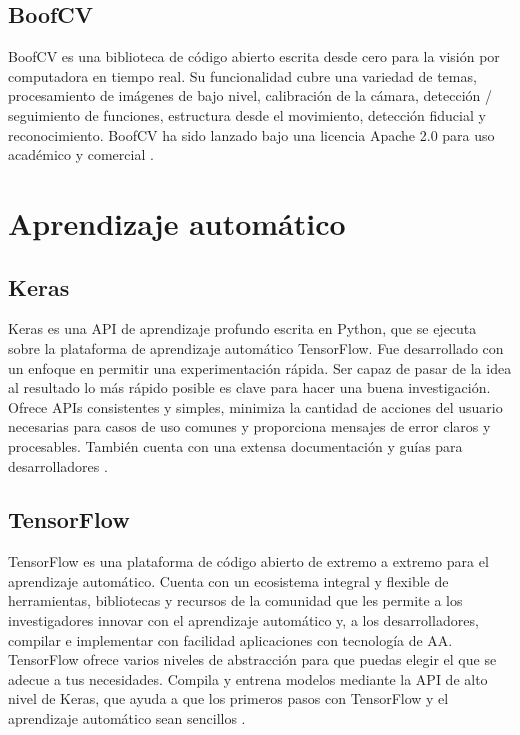 \subsection*{BoofCV}
BoofCV es una biblioteca de código abierto escrita desde cero para la visión por computadora en tiempo real. Su funcionalidad cubre una variedad de temas, procesamiento de imágenes de bajo nivel, calibración de la cámara, detección / seguimiento de funciones, estructura desde el movimiento, detección fiducial y reconocimiento. BoofCV ha sido lanzado bajo una licencia Apache 2.0 para uso académico y comercial \cite{BoofCV}.

\section*{Aprendizaje automático}
\subsection*{Keras}
Keras es una API de aprendizaje profundo escrita en Python, que se ejecuta sobre la plataforma de aprendizaje automático TensorFlow. Fue desarrollado con un enfoque en permitir una experimentación rápida. Ser capaz de pasar de la idea al resultado lo más rápido posible es clave para hacer una buena investigación. Ofrece APIs consistentes y simples, minimiza la cantidad de acciones del usuario necesarias para casos de uso comunes y proporciona mensajes de error claros y procesables. También cuenta con una extensa documentación y guías para desarrolladores \cite{Keras}.

\subsection*{TensorFlow}
TensorFlow es una plataforma de código abierto de extremo a extremo para el aprendizaje automático. Cuenta con un ecosistema integral y flexible de herramientas, bibliotecas y recursos de la comunidad que les permite a los investigadores innovar con el aprendizaje automático y, a los desarrolladores, compilar e implementar con facilidad aplicaciones con tecnología de AA. TensorFlow ofrece varios niveles de abstracción para que puedas elegir el que se adecue a tus necesidades. Compila y entrena modelos mediante la API de alto nivel de Keras, que ayuda a que los primeros pasos con TensorFlow y el aprendizaje automático sean sencillos \cite{TensorFlow}.

